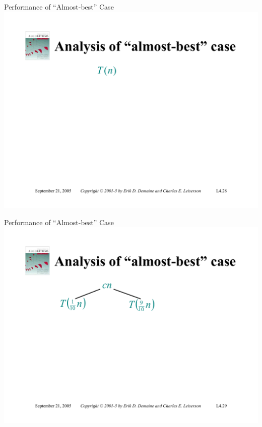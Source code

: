 \documentclass{beamer}
\begin{document}
\begin{frame}{Performance of ``Almost-best'' Case}
    \centering
    \includegraphics[width=\textwidth, trim={1.00cm 1.50cm 1.00cm 4.25cm}, clip]{pages/lec4_28}
\end{frame}
\begin{frame}{Performance of ``Almost-best'' Case}
    \centering
    \includegraphics[width=\textwidth, trim={1.00cm 1.50cm 1.00cm 4.25cm}, clip]{pages/lec4_29}
\end{frame}
\end{document}
